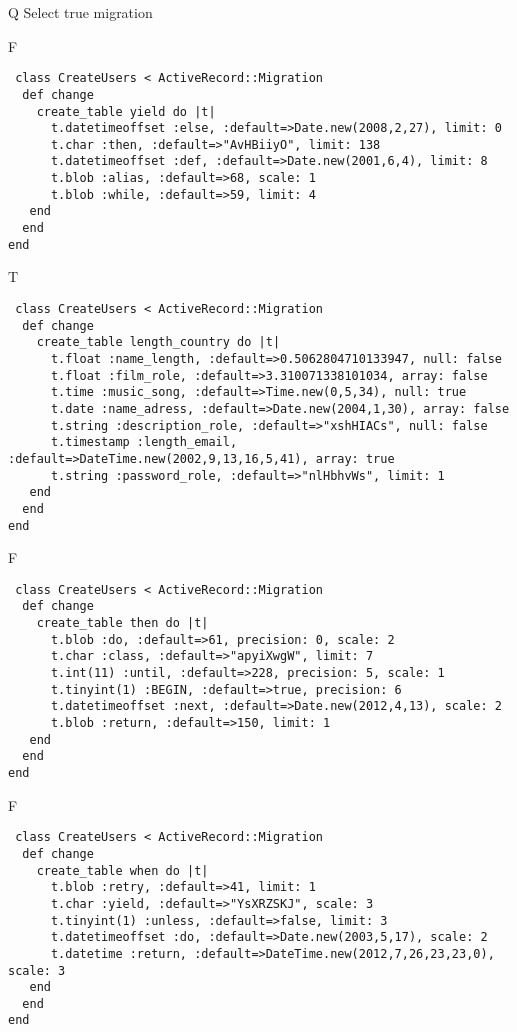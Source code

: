 Q
Select true migration

F
\begin{verbatim}
 class CreateUsers < ActiveRecord::Migration 
  def change 
    create_table yield do |t| 
      t.datetimeoffset :else, :default=>Date.new(2008,2,27), limit: 0
      t.char :then, :default=>"AvHBiiyO", limit: 138
      t.datetimeoffset :def, :default=>Date.new(2001,6,4), limit: 8
      t.blob :alias, :default=>68, scale: 1
      t.blob :while, :default=>59, limit: 4
   end 
  end 
end
\end{verbatim}

T
\begin{verbatim}
 class CreateUsers < ActiveRecord::Migration 
  def change 
    create_table length_country do |t| 
      t.float :name_length, :default=>0.5062804710133947, null: false
      t.float :film_role, :default=>3.310071338101034, array: false
      t.time :music_song, :default=>Time.new(0,5,34), null: true
      t.date :name_adress, :default=>Date.new(2004,1,30), array: false
      t.string :description_role, :default=>"xshHIACs", null: false
      t.timestamp :length_email, :default=>DateTime.new(2002,9,13,16,5,41), array: true
      t.string :password_role, :default=>"nlHbhvWs", limit: 1
   end 
  end 
end
\end{verbatim}

F
\begin{verbatim}
 class CreateUsers < ActiveRecord::Migration 
  def change 
    create_table then do |t| 
      t.blob :do, :default=>61, precision: 0, scale: 2
      t.char :class, :default=>"apyiXwgW", limit: 7
      t.int(11) :until, :default=>228, precision: 5, scale: 1
      t.tinyint(1) :BEGIN, :default=>true, precision: 6
      t.datetimeoffset :next, :default=>Date.new(2012,4,13), scale: 2
      t.blob :return, :default=>150, limit: 1
   end 
  end 
end
\end{verbatim}

F
\begin{verbatim}
 class CreateUsers < ActiveRecord::Migration 
  def change 
    create_table when do |t| 
      t.blob :retry, :default=>41, limit: 1
      t.char :yield, :default=>"YsXRZSKJ", scale: 3
      t.tinyint(1) :unless, :default=>false, limit: 3
      t.datetimeoffset :do, :default=>Date.new(2003,5,17), scale: 2
      t.datetime :return, :default=>DateTime.new(2012,7,26,23,23,0), scale: 3
   end 
  end 
end
\end{verbatim}
